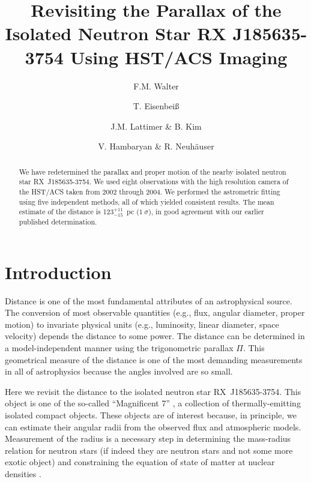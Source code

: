 \documentclass[12pt,preprint]{aastex}
\newcommand{\ud}[2]{\mbox{$^{+ #1}_{- #2}$}}
\begin{document}
\title{Revisiting the Parallax of the Isolated Neutron Star RX J185635-3754 
Using HST/ACS Imaging}

\author{F.M. Walter }

\author{T. Eisenbei\ss }

\author{J.M. Lattimer \& B. Kim }

\author{V. Hambaryan \& R. Neuh\"auser }

\begin{abstract}

We have redetermined the parallax and proper motion of the nearby
isolated neutron star RX~J185635-3754. We used eight observations with the high
resolution camera of the HST/ACS taken from 2002 through 2004. 
We performed the astrometric fitting using five independent methods, all
of which yielded consistent results.
The mean estimate of the distance is 123\ud{11}{15}~pc ($1~\sigma$), 
in good agreement with our earlier published determination.

\end{abstract}


\section{Introduction}

Distance is one of the most fundamental attributes of an astrophysical
source. The conversion of most observable quantities (e.g., flux, angular
diameter, proper motion) to invariate physical units
(e.g., luminosity, linear diameter, space velocity) depends
the distance to some power.
The distance can be determined in a model-independent manner using the
trigonometric parallax $\Pi$.
This geometrical measure of the distance 
is one of the most demanding measurements in all of astrophysics because the
angles involved are so small.

Here we revisit the distance to the isolated neutron star RX~J185635-3754.
This object is one of the so-called ``Magnificent 7'' \citep{Ha07},
a collection of thermally-emitting isolated compact objects. 
These objects are of interest because,
in principle, we can estimate their angular radii from the observed flux
and atmospheric models. Measurement of the radius is a necessary
step in determining the mass-radius relation for neutron stars (if indeed they
are neutron stars and not some more exotic object) and
constraining the equation of state of matter at nuclear densities \citep{LP01}.
\end{document}
